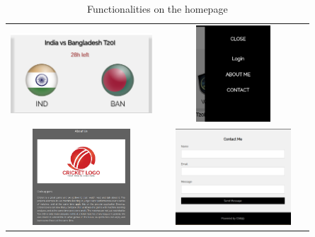 \documentclass[12pt]{article}
\begin{document}
\begin{center}

\begin{table}[!h]
\begin{center}
\begin{tabular}{ c c }
    \includegraphics[height=3.6cm,width=5.3cm]{match.png} & \includegraphics[height=3.6cm,width=5.3cm]{menubar.png}\\
    \includegraphics[height=3.6cm,width=5.3cm]{aboutus.png} &         \includegraphics[height=3.6cm,width=5.3cm]{contactme.png}
\end{tabular}
\caption{Functionalities on the homepage}
\end{center}
\end{table}
\end{center}
\end{document}
